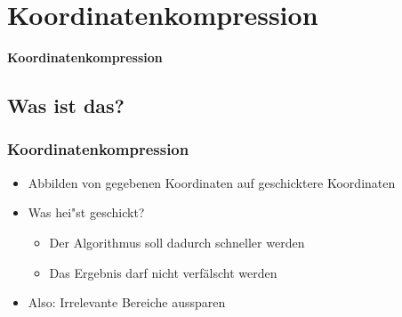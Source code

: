 \section{Koordinatenkompression}
\begin{frame}
	\begin{center}
		\textbf{\LARGE{Koordinatenkompression}}
	\end{center}
\end{frame}

\subsection{Was ist das?}
\begin{frame}
	\frametitle{{Koordinatenkompression}}
	\begin{itemize}
		\item Abbilden von gegebenen Koordinaten auf geschicktere Koordinaten
		\pause
		\item Was hei"st geschickt?
		\pause
		\begin{itemize}
			\item Der Algorithmus soll dadurch schneller werden
			\pause
			\item Das Ergebnis darf nicht verfälscht werden
		\end{itemize}
		\pause
		\item Also: Irrelevante Bereiche aussparen
	\end{itemize}
\end{frame}


